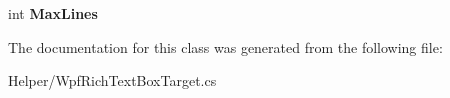\begin{DoxyCompactItemize}
\item 
int {\bfseries Max\+Lines}\hypertarget{class_power_system_planning_wpf_app_1_1_helper_1_1_wpf_rich_text_box_target_a0fa0becc053a1ce5e092b8aa6d53ae9c}{}\label{class_power_system_planning_wpf_app_1_1_helper_1_1_wpf_rich_text_box_target_a0fa0becc053a1ce5e092b8aa6d53ae9c}

\end{DoxyCompactItemize}


The documentation for this class was generated from the following file\+:\begin{DoxyCompactItemize}
\item 
Helper/Wpf\+Rich\+Text\+Box\+Target.\+cs\end{DoxyCompactItemize}
